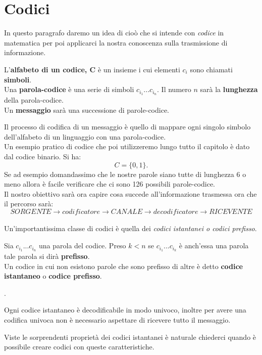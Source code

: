 \section{Codici}
\label{sec:Codici}
In questo paragrafo daremo un idea di cioò che si intende con \textit{codice} in matematica per poi applicarci la nostra conoscenza sulla trasmissione di informazione.\\
\begin{defi}
L'\textbf{alfabeto di un codice, C} è un insieme \acode i cui elementi $c_i$ sono chiamati \textbf{simboli}.\\
Una \textbf{parola-codice} è una serie di simboli $c_{i_1}...c_{i_n}$. Il numero $n$ sarà la \textbf{lunghezza} della parola-codice.\\
Un \textbf{messaggio} sarà una successione di parole-codice.
\end{defi}
Il processo di codifica di un messaggio è quello di mappare ogni singolo  simbolo dell'alfabeto di un linguaggio con una parola-codice.\\
Un esempio pratico di codice che poi utilizzeremo lungo tutto il capitolo è dato dal codice binario. Si ha:
$$C=\{0, 1 \}.$$
Se ad esempio domandassimo che le nostre parole siano tutte di lunghezza 6 o meno allora è facile verificare che ci sono 126 possibili parole-codice.\\
Il nostro obiettivo sarà ora capire cosa succede all'informazione trasmessa ora che il percorso sarà:
$$ SORGENTE \to codificatore \to CANALE \to decodificatore \to RICEVENTE$$
\\
Un'importantissima classe di codici è quella dei \textit{codici istantanei o codici prefisso}.
\begin{defi}
Sia $c_{i_1}...c_{i_n}$ una parola del codice. Preso $k<n$ se  $c_{i_1}...c_{i_k}$
è anch'essa una parola tale parola si dirà \textbf{prefisso}.\\
Un codice in cui non esistono parole che sono prefisso di altre è detto \textbf{codice istantaneo} o \textbf{codice prefisso}.
\end{defi}.
\begin{lem}
Ogni codice istantaneo è decodificabile in modo univoco, inoltre per avere una codifica univoca non è necessario aspettare di ricevere tutto il messaggio.
\end{lem}

Viste le sorprendenti proprietà dei codici istantanei è naturale chiederci quando è possibile creare codici con queste caratteristiche.


